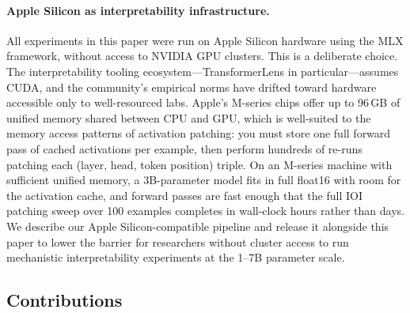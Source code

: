 \documentclass[11pt,a4paper]{article}
\begin{document}
\paragraph{Apple Silicon as interpretability infrastructure.}
All experiments in this paper were run on Apple Silicon hardware using the MLX
framework, without access to NVIDIA GPU clusters. This is a deliberate choice. The
interpretability tooling ecosystem---TransformerLens in particular---assumes CUDA, and
the community's empirical norms have drifted toward hardware accessible only to
well-resourced labs. Apple's M-series chips offer up to 96\,GB of unified memory
shared between CPU and GPU, which is well-suited to the memory access patterns of
activation patching: you must store one full forward pass of cached activations per
example, then perform hundreds of re-runs patching each (layer, head, token position)
triple. On an M-series machine with sufficient unified memory, a 3B-parameter model
fits in full float16 with room for the activation cache, and forward passes are fast
enough that the full IOI patching sweep over 100 examples completes in wall-clock hours
rather than days. We describe our Apple Silicon-compatible pipeline and release it
alongside this paper to lower the barrier for researchers without cluster access to run
mechanistic interpretability experiments at the 1--7B parameter scale.

\subsection*{Contributions}
\end{document}

